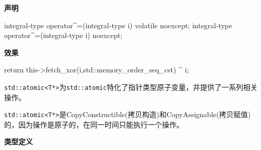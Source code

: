 \textbf{声明}

\begin{cpp}
integral-type operator^=(integral-type i) volatile noexcept;
integral-type operator^=(integral-type i) noexcept;
\end{cpp}

\textbf{效果}

\begin{cpp}
return this->fetch_xor(i,std::memory_order_seq_cst) ^ i;
\end{cpp}


\texttt{std::atomic<T*>}为\texttt{std::atomic}特化了指针类型原子变量，并提供了一系列相关操作。

\texttt{std::atomic<T*>}是CopyConstructible(拷贝构造)和CopyAssignable(拷贝赋值)的，因为操作是原子的，在同一时间只能执行一个操作。

\textbf{类型定义}

